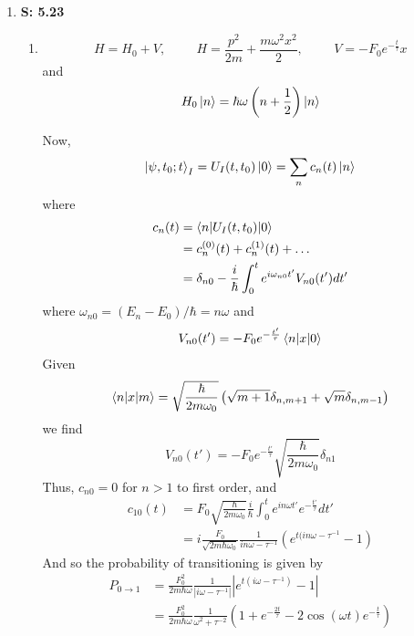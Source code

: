 \documentclass[12pt, letterpaper]{article}
\begin{document}
\begin{enumerate}
    
    \item[] \textbf{S: 5.23}
    \begin{enumerate}
        \item 
        \begin{equation}
            H=H_0+V,\hspace{1cm} H=\frac{p^2}{2m}+\frac{m\omega^2 x^2}{2},\hspace{1cm}V=-F_0e^{-\frac{t}{\tau}}x
        \end{equation}
        and
        \begin{equation}
            H_0\ket{n}=\hbar \omega\left(n+\frac{1}{2}\right)\ket{n}
        \end{equation}
        
        Now,
        \begin{equation}
            \ket{\psi,t_0;t}_I=U_I(t,t_0)\ket{0}=\sum_{n}c_n(t)\ket{n}
        \end{equation}
        where 
        \begin{align}
           c_n(t)&=\braket{n|U_I(t,t_0)|0}\\&=c_n^{(0)}(t)+c_n^{(1)}(t)+\ldots\\&=\delta_{n0}-\frac{i}{\hbar}\int_0^t e^{i\omega_{n0}t'}V_{n0}(t')dt'
        \end{align}
        where $\omega_{n0}=(E_n-E_0)/\hbar=n\omega$ and 
        \begin{align}
            V_{n0}(t')=-F_0e^{-\frac{t'}{\tau}}\braket{n|x|0}
        \end{align}
        Given 
        \begin{equation}
            \braket{n|x|m}=\sqrt{\frac{\hbar}{2m\omega_0}}\left(\sqrt{m+1}\delta_{n,m+1}+\sqrt{m}\delta_{n,m-1}\right)
        \end{equation}
        we find
        \begin{equation}
            V_{n0}(t')=-F_0e^{-\frac{t'}{\tau}}\sqrt{\frac{\hbar}{2m\omega_0}}\delta_{n1}
        \end{equation}
        Thus, $c_{n0}=0$ for $n>1$ to first order, and 
        \begin{align}
            c_{10}(t)&=F_0\sqrt{\frac{\hbar}{2m\omega_0}}\frac{i}{\hbar}\int_0^t e^{in\omega t'}e^{-\frac{t'}{\tau}}dt'\\&=i\frac{F_0}{\sqrt{2m\hbar \omega_0}}\frac{1}{in\omega -\tau^{-1}}\left(e^{t (in\omega-\tau^{-1}}-1\right)
        \end{align}
        And so the probability of transitioning is given by
        \begin{align}
            P_{0\to 1}&=\frac{F_0^2}{2m\hbar \omega}\frac{1}{\left|i\omega -\tau^{-1}\right|}\left|e^{t\left(i\omega-\tau^{-1}\right)}-1\right|\\&=\frac{F_0^2}{2m\hbar \omega}\frac{1}{\omega^2+\tau^{-2}}\left(1+e^{-\frac{2t}{\tau}}-2\cos\left(\omega t\right)e^{-\frac{t}{\tau}}\right)
        \end{align}
        

\end{enumerate}
\end{enumerate}
\end{document}
